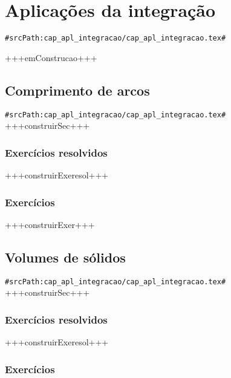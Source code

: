 
\chapter{Aplicações da integração}
\verb+#srcPath:cap_apl_integracao/cap_apl_integracao.tex#+
\label{cap:apl_integracao}

+++emConstrucao+++

\section{Comprimento de arcos}
\verb+#srcPath:cap_apl_integracao/cap_apl_integracao.tex#+
+++construirSec+++

\subsection*{Exercícios resolvidos}

+++construirExeresol+++


\subsection*{Exercícios}

+++construirExer+++


\section{Volumes de sólidos}
\verb+#srcPath:cap_apl_integracao/cap_apl_integracao.tex#+
+++construirSec+++

\subsection*{Exercícios resolvidos}

+++construirExeresol+++


\subsection*{Exercícios}

